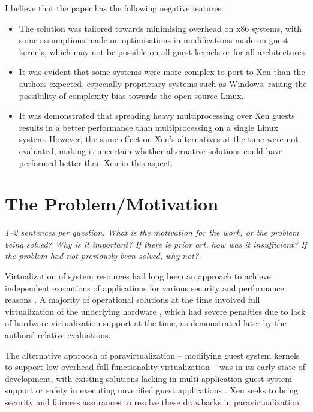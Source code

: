 \documentclass[11pt]{article}
\begin{document}
I believe that the paper has the following negative features:
\begin{itemize}
	\item The solution was tailored towards minimising overhead on x86 systems, with some assumptions made on optimisations in modifications made on guest kernels, which may not be possible on all guest kernels or for all architectures.
	\item It was evident that some systems were more complex to port to Xen than the authors expected, especially proprietary systems such as Windows, raising the possibility of complexity bias towards the open-source Linux.
	\item It was demonstrated that spreading heavy multiprocessing over Xen guests results in a better performance than multiprocessing on a single Linux system. However, the same effect on Xen's alternatives at the time were not evaluated, making it uncertain whether alternative solutions could have performed better than Xen in this aspect.
\end{itemize}

\section*{The Problem/Motivation}
\textsl{1--2 sentences per question. What is the motivation for the work, or the problem being solved? Why is it important? If there is prior art, how was it insufficient? If the problem had not previously been solved, why not?}

Virtualization of system resources had long been an approach to achieve independent executions of applications for various security and performance reasons \cite{xing2012virtualization}. A majority of operational solutions at the time involved full virtualization of the underlying hardware \cite{goud2010method} \cite{devine2002virtualization}, which had severe penalties due to lack of hardware virtualization support at the time, as demonstrated later by the authors' relative evaluations. 

The alternative approach of paravirtualization -- modifying guest system kernels to support low-overhead full functionality virtualization -- was in its early state of development, with existing solutions lacking in multi-application guest system support \cite{whitaker2002scale} or safety in executing unverified guest applications \cite{peterson2003blueprint}. Xen seeks to bring security and fairness assurances to resolve these drawbacks in paravirtualization.
\end{document}
